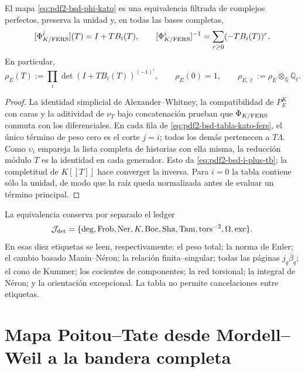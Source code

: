 \begin{theorem}
\label{thm:pdf2-bsd-equivalencia-kato-fers}
El mapa \eqref{eq:pdf2-bsd-phi-kato} es una equivalencia filtrada de
complejos perfectos, preserva la unidad y, en todas las bases completas,
\begin{equation}\label{eq:pdf2-bsd-i-plus-tb}
 [\Phi_{K/{\rm FERS}}^i](T)=I+TB_i(T),
 \qquad
 [\Phi_{K/{\rm FERS}}^i]^{-1}
 =\sum_{r\ge0}(-TB_i(T))^r.
\end{equation}
En particular,
\begin{equation}\label{eq:pdf2-bsd-rho-uno}
 \rho_E(T):=
 \prod_i\det(I+TB_i(T))^{(-1)^i},
 \qquad \rho_E(0)=1,
 \qquad
 \rho_{E,\ell}:=\rho_E\otimes_{\mathbb Q}\mathbb Q_\ell.
\end{equation}
\end{theorem}

\begin{proof}
La identidad simplicial de Alexander--Whitney, la compatibilidad de $P_E^K$
con caras y la aditividad de $\nu_T$ bajo concatenación prueban que
$\Phi_{K/{\rm FERS}}$ conmuta con los diferenciales. En cada fila de
\eqref{eq:pdf2-bsd-tabla-kato-fers}, el único término de peso cero es el
corte $j=i$; todos los demás pertenecen a $T\Lambda$. Como
$\upsilon_i$ empareja la lista completa de historias con ella misma, la
reducción módulo $T$ es la identidad en cada generador. Esto da
\eqref{eq:pdf2-bsd-i-plus-tb}; la completitud de $K[[T]]$ hace converger la
inversa. Para $i=0$ la tabla contiene sólo la unidad, de modo que la raíz
queda normalizada antes de evaluar un término principal.
\end{proof}

La equivalencia conserva por separado el ledger
\begin{equation}\label{eq:pdf2-bsd-ledger-diez}
 \mathcal J_{\rm det}=\{\deg,\operatorname{Frob},\operatorname{Ner},
 K,\operatorname{Boc},\operatorname{Sha},\operatorname{Tam},
 \operatorname{tors}^{-2},\Omega,\operatorname{exc}\}.
\end{equation}
En esas diez etiquetas se leen, respectivamente: el peso total; la norma de
Euler; el cambio basado Manin--Néron; la relación finita--singular; todas las
páginas $j_q\bar\beta_q$; el cono de Kummer; los cocientes de componentes;
la red torsional; la integral de Néron; y la orientación excepcional. La
tabla no permite cancelaciones entre etiquetas.

\section{Mapa Poitou--Tate desde Mordell--Weil a la bandera completa}

